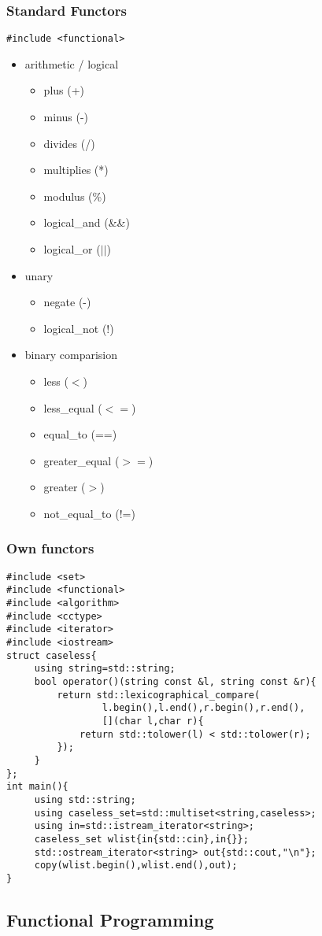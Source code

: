 \subsubsection{Standard Functors}
\begin{lstlisting}
#include <functional>
\end{lstlisting}
\begin{itemize}
\item arithmetic / logical
	\begin{itemize}
	\item plus (+)
	\item minus (-)
	\item divides (/)
	\item multiplies (*)
	\item modulus (\%)
	\item logical\_and (\&\&)
	\item logical\_or ($||$)
	\end{itemize}
	
	\item unary
	\begin{itemize}
	\item negate (-)
	\item logical\_not (!)
	\end{itemize}
	
	\item binary comparision
	\begin{itemize}
	\item less ($<$)
	\item less\_equal ($<=$)
	\item equal\_to (==)
	\item greater\_equal ($>=$)
	\item greater ($>$)
	\item not\_equal\_to (!=)
	\end{itemize}
\end{itemize}

\subsubsection{Own functors}
\begin{lstlisting}
#include <set>
#include <functional>
#include <algorithm>
#include <cctype>
#include <iterator>
#include <iostream>
struct caseless{
	 using string=std::string;
	 bool operator()(string const &l, string const &r){
	 	 return std::lexicographical_compare(
	 	 	 	 l.begin(),l.end(),r.begin(),r.end(),
	 	 	 	 [](char l,char r){
	 	 	 return std::tolower(l) < std::tolower(r);
	 	 });
	 }
};
int main(){
	 using std::string;
	 using caseless_set=std::multiset<string,caseless>;
	 using in=std::istream_iterator<string>;
	 caseless_set wlist{in{std::cin},in{}};
	 std::ostream_iterator<string> out{std::cout,"\n"};
	 copy(wlist.begin(),wlist.end(),out);
}
\end{lstlisting}

\subsection{Functional Programming}

